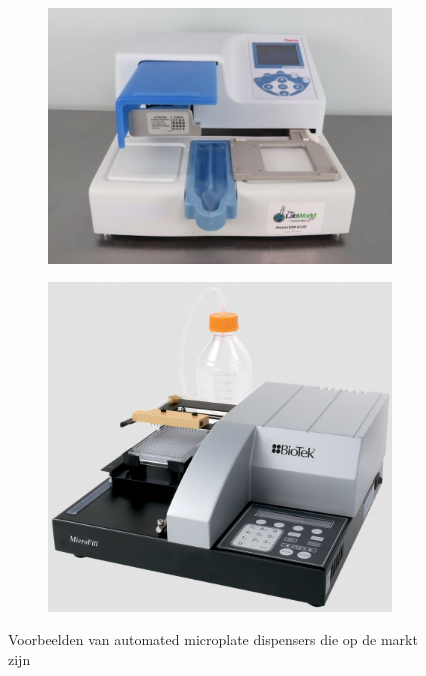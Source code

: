 \documentclass[a4paper,twoside,kulak]{kulakreport} %
\begin{document}
\begin{figure}
	\centering
	\begin{subfigure}{.5\textwidth}
		\centering
		\includegraphics[width=0.9\linewidth]{microplateDispenserThermo.png}
	\end{subfigure}%
	\begin{subfigure}{.5\textwidth}
		\centering
		\includegraphics[width=0.9\linewidth]{microplateDispenserBioTek.png}
	\end{subfigure}
	\caption{Voorbeelden van automated microplate dispensers die op de markt zijn}
	\label{fig: microplateDispensers}
\end{figure}
\end{document}
